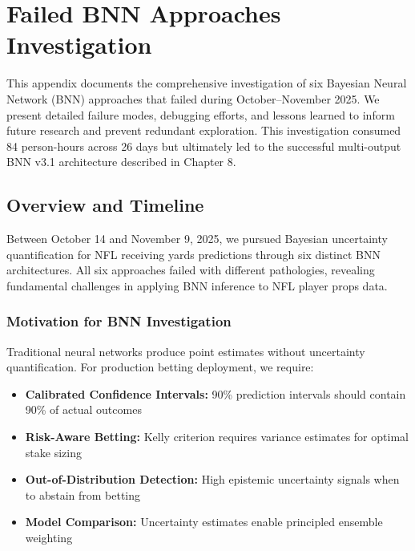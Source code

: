 \chapter{Failed BNN Approaches Investigation}
\label{app:bnn-failures}

This appendix documents the comprehensive investigation of six Bayesian Neural Network (BNN) approaches that failed during October--November 2025. We present detailed failure modes, debugging efforts, and lessons learned to inform future research and prevent redundant exploration. This investigation consumed 84 person-hours across 26 days but ultimately led to the successful multi-output BNN v3.1 architecture described in Chapter 8.





\section{Overview and Timeline}

Between October 14 and November 9, 2025, we pursued Bayesian uncertainty quantification for NFL receiving yards predictions through six distinct BNN architectures. All six approaches failed with different pathologies, revealing fundamental challenges in applying BNN inference to NFL player props data.

\subsection{Motivation for BNN Investigation}

Traditional neural networks produce point estimates without uncertainty quantification. For production betting deployment, we require:

\begin{itemize}
  \item \textbf{Calibrated Confidence Intervals:} 90\% prediction intervals should contain 90\% of actual outcomes
  \item \textbf{Risk-Aware Betting:} Kelly criterion requires variance estimates for optimal stake sizing
  \item \textbf{Out-of-Distribution Detection:} High epistemic uncertainty signals when to abstain from betting
  \item \textbf{Model Comparison:} Uncertainty estimates enable principled ensemble weighting
\end{itemize}

